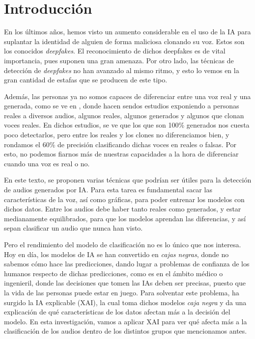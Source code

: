 \section{Introducción}
\label{sec:intro}
En los últimos años, hemos visto un aumento considerable en el uso de la IA para suplantar la identidad de alguien de forma maliciosa clonando su voz. Estos son los conocidos \emph{deepfakes}. El reconocimiento de dichos deepfakes es de vital importancia, pues suponen una gran amenaza. Por otro lado, las técnicas de detección de \emph{deepfakes} no han avanzado al mismo ritmo, y esto lo vemos en la gran cantidad de estafas que se producen de este tipo.

\hspace{.7cm} 
Además, las personas ya no somos capaces de diferenciar entre una voz real y una generada, como se ve en \cite{1Barrington2025, 2Nadine2025}, donde hacen sendos estudios exponiendo a personas reales a diversos audios, algunos reales, algunos generados y algunos que clonan voces reales. En dichos estudios, se ve que los que son 100\% generados nos cuesta poco detectarlos, pero entre los reales y los clones no diferenciamos bien, y rondamos el 60\% de precisión clasificando dichas voces en reales o falsas. Por esto, no podemos fiarnos más de nuestras capacidades a la hora de diferenciar cuando una voz es real o no.

\hspace{.7cm}	
En este texto, se proponen varias técnicas que podrían ser útiles para la detección de audios generados por IA. Para esta tarea es fundamental sacar las características de la voz, así como gráficas, para poder entrenar los modelos con dichos datos. Entre los audios debe haber tanto reales como generados, y estar medianamente equilibrados, para que los modelos aprendan las diferencias, y así sepan clasificar un audio que nunca han visto.

\hspace{.7cm}
Pero el rendimiento del modelo de clasificación no es lo único que nos interesa. Hoy en día, los modelos de IA se han convertido en \emph{cajas negras}, donde no sabemos cómo hace las predicciones, dando lugar a problemas de confianza de los humanos respecto de dichas predicciones, como es en el ámbito médico o ingenieril, donde las decisiones que tomen las IAs deben ser precisas, puesto que la vida de las personas puede estar en juego. Para solventar este problema, ha surgido la IA explicable (XAI), la cual toma dichos modelos \emph{caja negra} y da una explicación de qué características de los datos afectan más a la decisión del modelo. En esta investigación, vamos a aplicar XAI para ver qué afecta más a la clasificación de los audios dentro de los distintos grupos que mencionamos antes.